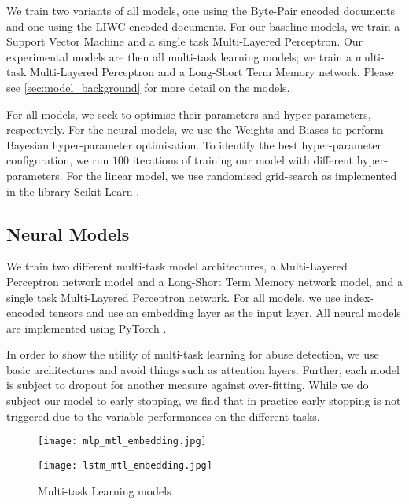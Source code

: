 We train two variants of all models, one using the Byte-Pair encoded documents and one using the LIWC encoded documents. For our baseline models, we train a Support Vector Machine and a single task Multi-Layered Perceptron. Our experimental models are then all multi-task learning models; we train a multi-task Multi-Layered Perceptron and a Long-Short Term Memory network. Please see \autoref{sec:model_background} for more detail on the models.

For all models, we seek to optimise their parameters and hyper-parameters, respectively. For the neural models, we use the Weights and Biases \cite{Wandb} to perform Bayesian hyper-parameter optimisation. To identify the best hyper-parameter configuration, we run $100$ iterations of training our model with different hyper-parameters. For the linear model, we use randomised grid-search as implemented in the library Scikit-Learn \cite{Pedregosa:2011}.

\subsection{Neural Models}

We train two different multi-task model architectures, a Multi-Layered Perceptron network model and a Long-Short Term Memory network model, and a single task Multi-Layered Perceptron network. For all models, we use index-encoded tensors and use an embedding layer as the input layer. All neural models are implemented using PyTorch \cite{Paszke:2019}.

In order to show the utility of multi-task learning for abuse detection, we use basic architectures and avoid things such as attention layers. Further, each model is subject to dropout for another measure against over-fitting.  While we do subject our model to early stopping, we find that in practice early stopping is not triggered due to the variable performances on the different tasks.

\begin{figure}
  \begin{minipage}{0.5\linewidth}
    \centering
    \texttt{[image: mlp\_mtl\_embedding.jpg]}
    \label{fig:mlp_mtl_embedding}
  \end{minipage}
  \begin{minipage}{0.5\linewidth}
    \centering
    \texttt{[image: lstm\_mtl\_embedding.jpg]}
    \label{fig:lstm_mtl_embedding}
  \end{minipage}
  \caption{Multi-task Learning models}
  \label{fig:mtl_models}
\end{figure}


